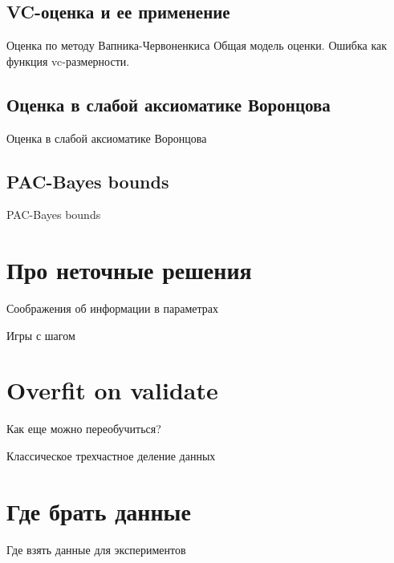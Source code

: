 \documentclass[14pt, fleqn, xcolor={dvipsnames, table}]{beamer}
\begin{document}
\subsection{VC-оценка и ее применение}
\begin{frame}{Оценка по методу Вапника-Червоненкиса}
Общая модель оценки.
Ошибка как функция vc-размерности.
\end{frame}

\subsection{Оценка в слабой аксиоматике Воронцова}
\begin{frame}{Оценка в слабой аксиоматике Воронцова}
\end{frame}

\subsection{PAC-Bayes bounds}
\begin{frame}{PAC-Bayes bounds}
\end{frame}

\section{Про неточные решения}
\begin{frame}{Соображения об информации в параметрах}
\end{frame}

\begin{frame}{Игры с шагом}
\end{frame}

\section{Overfit on validate}
\begin{frame}{Как еще можно переобучиться?}
\end{frame}

\begin{frame}{Классическое трехчастное деление данных}
\end{frame}

\section{Где брать данные}
\begin{frame}{Где взять данные для экспериментов}
\end{frame}
\end{document}
